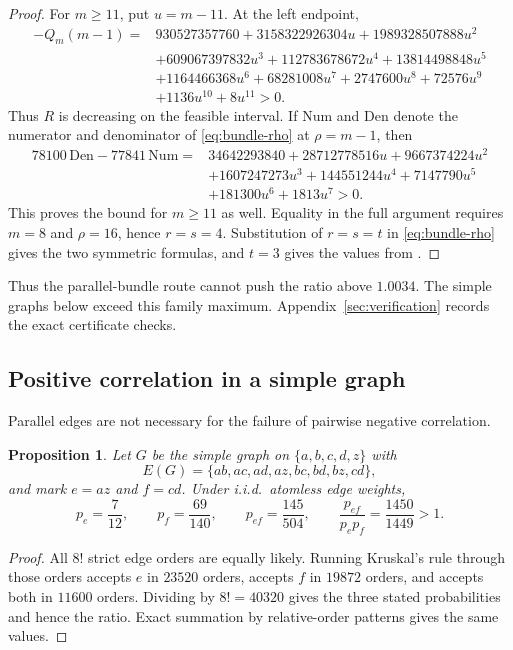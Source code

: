 \documentclass[11pt,a4paper]{amsart}
\theoremstyle{plain}
\newtheorem{proposition}[theorem]{Proposition}
\theoremstyle{definition}
\theoremstyle{remark}
\begin{document}
\begin{proof}
For $m\ge11$, put $u=m-11$. At the left endpoint,
\begin{align*}
-Q_m(m-1)={}&930527357760+3158322926304u+1989328507888u^2\\
&+609067397832u^3+112783678672u^4+13814498848u^5\\
&+1164466368u^6+68281008u^7+2747600u^8+72576u^9\\
&+1136u^{10}+8u^{11}>0.
\end{align*}
Thus $R$ is decreasing on the feasible interval. If $\mathrm{Num}$ and
$\mathrm{Den}$ denote the numerator and denominator of
\eqref{eq:bundle-rho} at $\rho=m-1$, then
\begin{align*}
78100\,\mathrm{Den}-77841\,\mathrm{Num}
={}&34642293840+28712778516u+9667374224u^2\\
&+1607247273u^3+144551244u^4+7147790u^5\\
&+181300u^6+1813u^7>0.
\end{align*}
This proves the bound for $m\ge11$ as well. Equality in the full argument
requires $m=8$ and $\rho=16$, hence $r=s=4$. Substitution of $r=s=t$ in
\eqref{eq:bundle-rho} gives the two symmetric formulas, and $t=3$ gives the
values from \cite{LPS}.
\end{proof}

Thus the parallel-bundle route cannot push the ratio above $1.0034$. The simple
graphs below exceed this family maximum. Appendix~\ref{sec:verification}
records the exact certificate checks.

\subsection{Positive correlation in a simple graph}

Parallel edges are not necessary for the failure of pairwise negative
correlation.

\begin{proposition}
\label{prop:simple-counterexample}
Let $G$ be the simple graph on $\{a,b,c,d,z\}$ with
\[
E(G)=\{ab,ac,ad,az,bc,bd,bz,cd\},
\]
and mark $e=az$ and $f=cd$. Under i.i.d.\ atomless edge weights,
\[
p_e=\frac7{12},\qquad p_f=\frac{69}{140},\qquad
p_{ef}=\frac{145}{504},\qquad
\frac{p_{ef}}{p_ep_f}=\frac{1450}{1449}>1.
\]
\end{proposition}

\begin{proof}
All $8!$ strict edge orders are equally likely. Running Kruskal's rule through
those orders accepts $e$ in $23520$ orders, accepts $f$ in $19872$ orders, and
accepts both in $11600$ orders. Dividing by $8!=40320$ gives the three stated
probabilities and hence the ratio. Exact summation by relative-order patterns
gives the same values.
\end{proof}
\end{document}

